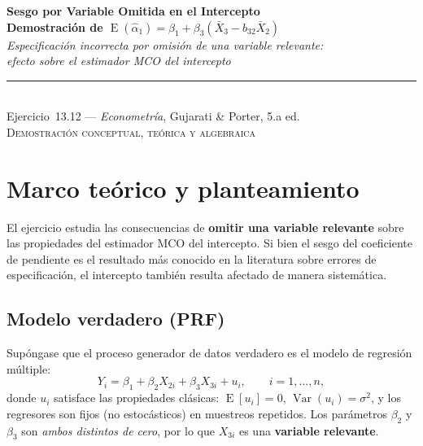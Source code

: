 \documentclass[12pt, letterpaper]{article}
\newcommand{\E}{\operatorname{E}}
\newcommand{\Var}{\operatorname{Var}}
\begin{document}
\begin{center}
  {\LARGE\bfseries Sesgo por Variable Omitida en el Intercepto}\\[6pt]
  {\LARGE\bfseries Demostración de $\E(\hat{\alpha}_1) = \beta_1 + \beta_3(\bar{X}_3 - b_{32}\bar{X}_2)$}\\[12pt]
  {\large\itshape Especificación incorrecta por omisión de una variable relevante:}\\
  {\large\itshape efecto sobre el estimador MCO del intercepto}\\[14pt]
  \rule{0.55\linewidth}{0.6pt}\\[8pt]
  {\normalsize Ejercicio~13.12 --- \textit{Econometría}, Gujarati \& Porter, 5.a ed.}\\[4pt]
  {\small\textsc{Demostración conceptual, teórica y algebraica}}
\end{center}

\vspace{10pt}

\section{Marco teórico y planteamiento}

El ejercicio estudia las consecuencias de \textbf{omitir una variable relevante}
sobre las propiedades del estimador MCO del intercepto. Si bien el sesgo
del coeficiente de pendiente es el resultado más conocido en la literatura
sobre errores de especificación, el intercepto también resulta afectado de
manera sistemática.

\subsection{Modelo verdadero (PRF)}

Supóngase que el proceso generador de datos verdadero es el modelo de
regresión múltiple:
\begin{equation}
  Y_i = \beta_1 + \beta_2 X_{2i} + \beta_3 X_{3i} + u_i,
  \qquad i = 1, \ldots, n,
  \label{eq:verdadero}
\end{equation}
donde $u_i$ satisface las propiedades clásicas: $\E[u_i] = 0$,
$\Var(u_i) = \sigma^2$, y los regresores son fijos (no estocásticos) en
muestreos repetidos. Los parámetros $\beta_2$ y $\beta_3$ son
\emph{ambos distintos de cero}, por lo que $X_{3i}$ es una
\textbf{variable relevante}.
\end{document}
